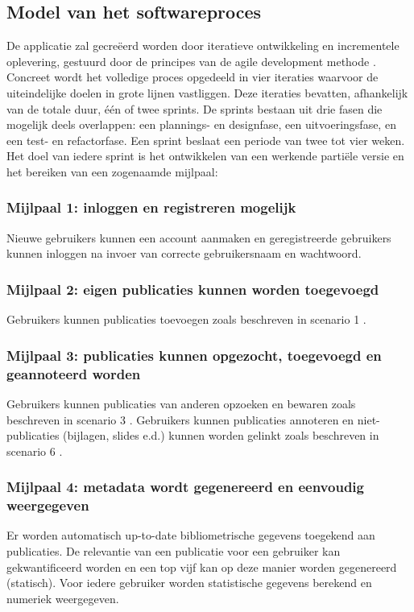 \documentclass{article}
\begin{document}
\subsection{Model van het softwareproces}

De applicatie zal gecre\"{e}erd worden door iteratieve ontwikkeling en incrementele oplevering, gestuurd door de principes van de agile development methode \cite{website:agile-process} . Concreet wordt het volledige proces opgedeeld in vier iteraties waarvoor de uiteindelijke doelen in grote lijnen vastliggen. Deze iteraties bevatten, afhankelijk van de totale duur, \'{e}\'{e}n of twee sprints. De sprints bestaan uit drie fasen die mogelijk deels overlappen: een plannings- en designfase, een uitvoeringsfase, en een test- en refactorfase. Een sprint beslaat een periode van twee tot vier weken. Het doel van iedere sprint is het ontwikkelen van een werkende parti\"{e}le versie en het bereiken van een zogenaamde mijlpaal:

\subsubsection*{Mijlpaal 1: inloggen en registreren mogelijk}

Nieuwe gebruikers kunnen een account aanmaken en geregistreerde gebruikers kunnen inloggen na invoer van correcte gebruikersnaam en wachtwoord.

\subsubsection*{Mijlpaal 2: eigen publicaties kunnen worden toegevoegd}
Gebruikers kunnen publicaties toevoegen zoals beschreven in scenario 1  \citep{Xtreport:organisatie}.
\subsubsection*{Mijlpaal 3: publicaties kunnen opgezocht, toegevoegd en geannoteerd worden}
Gebruikers kunnen publicaties van anderen opzoeken en bewaren zoals beschreven in scenario 3 \citep{Xtreport:organisatie}. Gebruikers kunnen publicaties annoteren en niet-publicaties (bijlagen, slides e.d.) kunnen worden gelinkt zoals beschreven in scenario 6 \citep{Xtreport:organisatie}.

\subsubsection*{Mijlpaal 4: metadata wordt gegenereerd en eenvoudig weergegeven}
Er worden automatisch up-to-date bibliometrische gegevens toegekend aan publicaties.
De relevantie van een publicatie voor een gebruiker kan gekwantificeerd worden en een top vijf kan op deze manier worden gegenereerd (statisch).
Voor iedere gebruiker worden statistische gegevens berekend en numeriek weergegeven.
\end{document}
